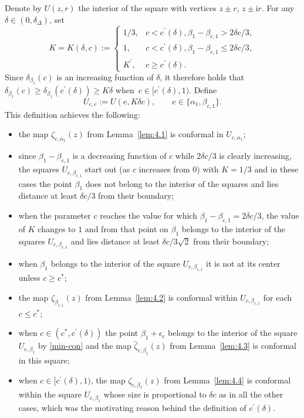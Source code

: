 \documentclass[10pt,a4paper]{amsart}
\numberwithin{equation}{section}
\newcommand{\ic}{\mathrm{i}}
\begin{document}
Denote by $ U(z,r) $ the interior of the square with vertices $ z\pm r$, $z\pm\ic r $. For any $ \delta\in(0,\delta_\Delta) $, set
\begin{equation}
\label{Kdeltac}
K = K(\delta,c) := \begin{cases}
1/3, & c<c^\prime(\delta), \beta_1-\beta_{c,1}>2\delta c/3, \\
1, & c<c^\prime(\delta), \beta_1-\beta_{c,1} \leq 2\delta c/3, \\
K^\prime, & c\geq c^\prime(\delta).
\end{cases}
\end{equation}
Since $ \delta_{\beta_1}(c) $ is an increasing function of $ \delta $, it therefore holds that $ \delta_{\beta_1}(c) \geq \delta_{\beta_1}(c^\prime(\delta)) \geq K\delta $ when~$ c \in [c^\prime(\delta),1) $. Define
\begin{equation}
\label{Uc1}
U_{c,e} := U(e,K\delta c), \qquad e\in \{\alpha_1,\beta_{c,1} \}.
\end{equation}
This definition achieves the following:
\begin{itemize}\itemsep=0pt
\item the map $ \zeta_{c,\alpha_1}(z) $ from Lemma~\ref{lem:4.1} is conformal in $ U_{c,\alpha_1} $;
\item since $ \beta_1-\beta_{c,1} $ is a decreasing function of $ c $ while $ 2\delta c/3 $ is clearly increasing, the squares $ U_{c,\beta_{c,1}} $ start out (as $ c $ increases from $0$) with $ K = 1/3 $ and in these cases the point $ \beta_1 $ does not belong to the interior of the squares and lies distance at least $ \delta c/3 $ from their boundary;
\item when the parameter $ c $ reaches the value for which $ \beta_1-\beta_{c,1}=2\delta c/3 $, the value of $ K $ changes to $ 1 $ and from that point on $ \beta_1 $ belongs to the interior of the squares $ U_{c,\beta_{c,1}} $ and lies distance at least $ \delta c/3\sqrt2 $ from their boundary;
\item when $ \beta_1 $ belongs to the interior of the square $ U_{c,\beta_{c,1}} $ it is not at its center unless $ c\geq c^* $;
\item the map $ \zeta_{\beta_{c,1}}(z) $ from Lemma~\ref{lem:4.2} is conformal within $ U_{c,\beta_{c,1}} $ for each $ c\leq c^* $;
\item when $ c\in(c^*,c^\prime(\delta)) $ the point $ \beta_1+\epsilon_c $ belongs to the interior of the square $ U_{c,\beta_1} $ by \eqref{min-con} and the map $ \hat\zeta_{c,\beta_1}(z) $ from Lemma~\ref{lem:4.3} is conformal in this square;
\item when $ c\in[c^\prime(\delta),1) $, the map $ \zeta_{c,\beta_1}(z) $ from Lemma~\ref{lem:4.4} is conformal within the square $ U_{c,\beta_1} $ whose size is proportional to $ \delta c $ as in all the other cases, which was the motivating reason behind the definition of $ c^\prime(\delta) $.
\end{itemize}
\end{document}
